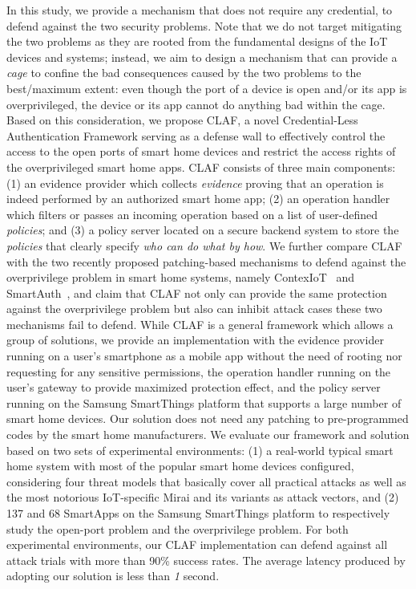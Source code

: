 \documentclass[letterpaper,12pt]{article}
\begin{document}
In this study, we provide a mechanism that does not require any credential, to defend against the two security problems. Note that we do not target mitigating the two problems as they are rooted from the fundamental designs of the IoT devices and systems; instead, we aim to design a mechanism that can provide a \emph{cage} to confine the bad consequences caused by the two problems to the best/maximum extent: even though the port of a device is open and/or its app is overprivileged, the device or its app cannot do anything bad within the cage. Based on this consideration, we propose CLAF, a novel Credential-Less Authentication Framework serving as a defense wall to effectively control the access to the open ports of smart home devices and restrict the access rights of the overprivileged smart home apps. CLAF consists of three main components: (1) an evidence provider which collects \textit{evidence} proving that an operation is indeed performed by an authorized smart home app; (2) an operation handler which filters or passes an incoming operation based on a list of user-defined \textit{policies}; and (3) a policy server located on a secure backend system to store the \textit{policies} that clearly specify \emph{who can do what by how}. 
We further compare CLAF with the two recently proposed patching-based mechanisms to defend against the overprivilege problem in smart home systems, namely ContexIoT~\cite{jia2017contexiot} and SmartAuth~\cite{tian2017smartauth}, and claim that CLAF not only can provide the same protection against the overprivilege problem but also can inhibit attack cases these two mechanisms fail to defend. While CLAF is a general framework which allows a group of solutions, we provide an implementation with the evidence provider running on a user's smartphone as a mobile app without the need of rooting nor requesting for any sensitive permissions, the operation handler running on the user's gateway to provide maximized protection effect, and the policy server running on the Samsung SmartThings platform that supports a large number of smart home devices. Our solution does not need any patching to pre-programmed codes by the smart home manufacturers. We evaluate our framework and solution based on two sets of experimental environments: (1) a real-world typical smart home system with most of the popular smart home devices configured, considering four threat models that basically cover all practical attacks as well as the most notorious IoT-specific Mirai and its variants as attack vectors, and (2) 137 and 68  SmartApps on the Samsung SmartThings platform to respectively study the open-port problem and the overprivilege problem. For both experimental environments, our CLAF implementation can defend against all attack trials with more than 90\% success rates. The average latency produced by adopting our solution is less than \emph{1} second. 
\end{document}
